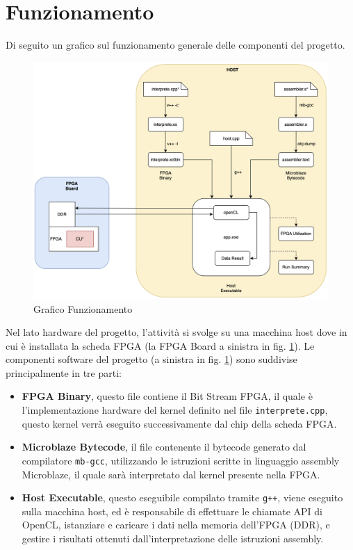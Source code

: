 \clearpage

\section{Funzionamento}
\label{funzionamento}

\noindent Di seguito un grafico sul funzionamento generale delle componenti del progetto.

\begin{figure}[h!]
    \centering
    \includegraphics[scale=0.5]{images/Capitolo3/6_im.png}
    \caption{Grafico Funzionamento}
    \label{funzionamentoOpenCL}
\end{figure}

Nel lato hardware del progetto, l'attività si svolge su una macchina host dove in cui è installata la scheda FPGA (la FPGA Board a sinistra in fig. \ref{funzionamentoOpenCL}). Le componenti software del progetto (a sinistra in fig. \ref{funzionamentoOpenCL}) sono suddivise principalmente in tre parti:

\begin{itemize}
    \item \textbf{FPGA Binary}, questo file contiene il Bit Stream FPGA, il quale è l'implementazione hardware del kernel definito nel file \texttt{interprete.cpp}, questo kernel verrà eseguito successivamente dal chip della scheda FPGA.
    \item \textbf{Microblaze Bytecode}, il file contenente il bytecode generato dal compilatore \texttt{mb-gcc}, utilizzando le istruzioni scritte in linguaggio assembly Microblaze, il quale sarà interpretato dal kernel presente nella FPGA.
    \item \textbf{Host Executable}, questo eseguibile compilato tramite \texttt{g++}, viene eseguito sulla macchina host, ed è responsabile di effettuare le chiamate API di OpenCL, istanziare e caricare i dati nella memoria dell'FPGA (DDR), e gestire i risultati ottenuti dall'interpretazione delle istruzioni assembly.
\end{itemize}

